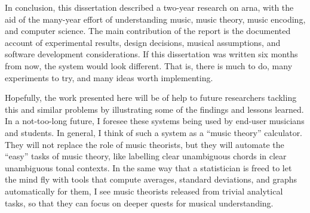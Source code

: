 
In conclusion, this dissertation described a two-year
research on \gls{arna}, with the aid of the many-year effort
of understanding music, music theory, music encoding, and
computer science. The main contribution of the report is the
documented account of experimental results, design
decisions, musical assumptions, and software development
considerations. If this dissertation was written six months
from now, the system would look different. That is, there is
much to do, many experiments to try, and many ideas worth
implementing. 


Hopefully, the work presented here will be of help to future
researchers tackling this and similar problems by
illustrating some of the findings and lessons learned. In a
not-too-long future, I foresee these systems being used by
end-user musicians and students. In general, I think of such
a system as a ``music theory'' calculator. They will not
replace the role of music theorists, but they will automate
the ``easy'' tasks of music theory, like labelling clear
unambiguous chords in clear unambiguous tonal contexts. In
the same way that a statistician is freed to let the mind
fly with tools that compute averages, standard deviations,
and graphs automatically for them, I see music theorists
released from trivial analytical tasks, so that they can
focus on deeper quests for musical understanding.
